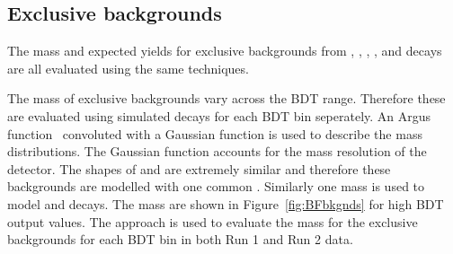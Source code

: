 {%

\subsection{Exclusive backgrounds}%
The mass \pdfs and expected yields for exclusive backgrounds from \bdpimunu, \bsKmunu, \lambdab, \bupimumu, \bdpimumu and \bcjpsimunu decays are all evaluated using the same techniques.

The mass \pdfs of exclusive backgrounds vary across the BDT range. Therefore these \pdfs are evaluated using simulated decays for each BDT bin seperately. An Argus function~\cite{Argus_pdf} convoluted with a Gaussian function is used to describe the mass distributions. The Gaussian function accounts for the mass resolution of the detector. The shapes of \bdpimunu and \bsKmunu are extremely similar and therefore these backgrounds are modelled with one common \pdf. Similarly one mass \pdf is used to model \bupimumu and \bdpimumu decays. The mass \pdfs are shown in Figure~\ref{fig:BFbkgnds} for high BDT output values. The approach is used to evaluate the mass \pdfs for the exclusive backgrounds for each BDT bin in both Run 1 and Run 2 data.

}
